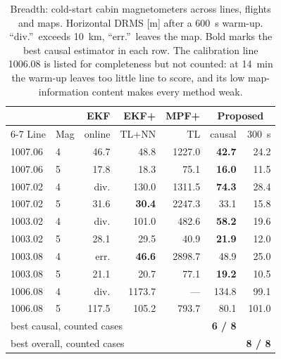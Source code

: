 \begin{table}[t]
\caption{Breadth: cold-start cabin magnetometers across lines, flights and maps.
Horizontal DRMS [m] after a \SI{600}{\second} warm-up. ``div.''\ exceeds
\SI{10}{\kilo\meter}, ``err.''\ leaves the map. Bold marks the best causal
estimator in each row. The calibration line 1006.08 is listed for completeness
but not counted: at \SI{14}{\minute} the warm-up leaves too little line to score,
and its low map-information content makes every method weak.}
\label{tab:breadth}
\centering
\setlength{\tabcolsep}{3.5pt}
\begin{tabular}{llrrr rr}
\toprule
 & & EKF & EKF{+} & MPF{+} & \multicolumn{2}{c}{Proposed} \\
\cmidrule(l){6-7}
Line & Mag & online & TL{+}NN & TL & causal & \SI{300}{\second} \\
\midrule
1007.06 & 4 & 46.7 & 48.8 & 1227.0 & \textbf{42.7} & 24.2 \\
1007.06 & 5 & 17.8 & 18.3 & 75.1 & \textbf{16.0} & 11.5 \\
1007.02 & 4 & div. & 130.0 & 1311.5 & \textbf{74.3} & 28.4 \\
1007.02 & 5 & 31.6 & \textbf{30.4} & 2247.3 & 33.1 & 15.8 \\
1003.02 & 4 & div. & 101.0 & 482.6 & \textbf{58.2} & 19.6 \\
1003.02 & 5 & 28.1 & 29.5 & 40.9 & \textbf{21.9} & 12.0 \\
1003.08 & 4 & err. & \textbf{46.6} & 2898.7 & 48.9 & 25.0 \\
1003.08 & 5 & 21.1 & 20.7 & 77.1 & \textbf{19.2} & 10.5 \\
\midrule
1006.08 & 4 & div. & 1173.7 & --- & 134.8 & 99.1 \\
1006.08 & 5 & 117.5 & 105.2 & 793.7 & 80.1 & 101.0 \\
\midrule
\multicolumn{5}{l}{best causal, counted cases} & \textbf{6 / 8} & \\
\multicolumn{5}{l}{best overall, counted cases} & & \textbf{8 / 8} \\
\bottomrule
\end{tabular}
\end{table}


